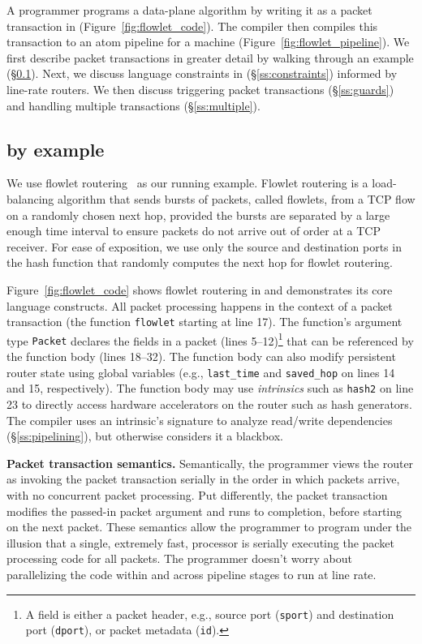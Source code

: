 A programmer programs a data-plane algorithm by writing it as
a packet transaction in \pktlanguage (Figure~\ref{fig:flowlet_code}).  The
\pktlanguage compiler then compiles this transaction to an atom pipeline for a
\absmachine machine (Figure~\ref{fig:flowlet_pipeline}). We first describe
packet transactions in greater detail by walking through an example
(\S\ref{ss:flowlet}). Next, we discuss language constraints in \pktlanguage
(\S\ref{ss:constraints}) informed by line-rate routers.  We then discuss
triggering packet transactions (\S\ref{ss:guards}) and handling multiple
transactions (\S\ref{ss:multiple}).

\subsection{\pktlanguage by example}
\label{ss:flowlet}

We use flowlet routering~\cite{flowlets} as our running example. Flowlet
routering is a load-balancing algorithm that sends bursts of packets, called
flowlets, from a TCP flow on a randomly chosen next hop, provided the bursts
are separated by a large enough time interval to ensure packets do not arrive
out of order at a TCP receiver. For ease of exposition, we use only the source
and destination ports in the hash function that randomly computes the next hop
for flowlet routering.

Figure~\ref{fig:flowlet_code} shows flowlet routering in \pktlanguage and
demonstrates its core language constructs. All packet processing happens in the
context of a packet transaction (the function \texttt{flowlet} starting at line
17). The function's argument type {\tt Packet} declares the fields in a packet
(lines 5--12)\footnote{A field is either a packet header, e.g.,
source port ({\tt sport}) and destination port ({\tt dport}), or packet
 metadata ({\tt id}).} that can be referenced by the function body (lines
18--32).  The function body can also modify persistent router state using
global variables (e.g., \texttt{last\_time} and \texttt{saved\_hop} on lines 14
and 15, respectively). The function body may use \textit{intrinsics} such as
\texttt{hash2} on line 23 to directly access hardware accelerators on the
router such as hash generators.  The \pktlanguage compiler uses an intrinsic's
signature to analyze read/write dependencies (\S\ref{ss:pipelining}), but otherwise considers it a blackbox.

\medskip
\noindent
\textbf{Packet transaction semantics.}
Semantically, the programmer views the router as invoking the packet transaction
serially in the order in which packets arrive, with no concurrent packet
processing.  Put differently, the packet transaction modifies the passed-in
packet argument and runs to completion, before starting on the next packet.
These semantics allow the programmer to program under the illusion that a
single, extremely fast, processor is serially executing the packet processing code for
all packets. The programmer doesn't worry about parallelizing the code within
and across pipeline stages to run at line rate.

